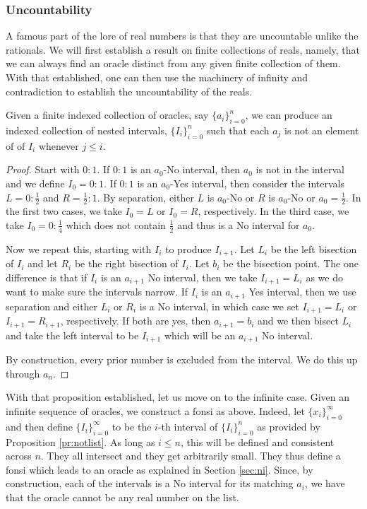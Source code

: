 \documentclass[12pt]{article}
\begin{document}
\subsubsection{Uncountability}

A famous part of the lore of real numbers is that they are uncountable unlike the rationals. We will first establish a result on finite collections of reals, namely, that we can always find an oracle distinct from any given finite collection of them. With that established, one can then use the machinery of infinity and contradiction to establish the uncountability of the reals. 

\begin{proposition}\label{pr:notlist}
Given a finite indexed collection of oracles, say $\{a_i\}_{i=0}^n$, we can produce an indexed collection of nested intervals, $\{I_i\}_{i=0}^n$ such that each $a_j$ is not an element of of $I_i$ whenever $j \leq i$.
\end{proposition}

\begin{proof}
Start with $0:1$. If $0:1$ is an $a_0$-No interval, then $a_0$ is not in the interval and we define $I_0 = 0:1$. If $0:1$ is an $a_0$-Yes interval, then consider the intervals $L= 0:\tfrac{1}{2}$ and $R = \tfrac{1}{2}:1$. By separation, either $L$ is $a_0$-No or $R$ is $a_0$-No or $a_0 = \tfrac{1}{2}$. In the first two cases, we take $I_0=L$ or $I_0=R$, respectively. In the third case, we take $I_0 = 0:\tfrac{1}{4}$ which does not contain $\tfrac{1}{2}$ and thus is a No interval for $a_0$.

Now we repeat this, starting with $I_i$ to produce $I_{i+1}$. Let $L_i$ be the left bisection of $I_i$ and let $R_i$ be the right bisection of $I_i$. Let $b_i$ be the bisection point. The one difference is that if $I_i$ is an $a_{i+1}$ No interval, then we take $I_{i+1} = L_i$ as we do want to make sure the intervals narrow. If $I_i$ is an $a_{i+1}$ Yes interval, then we use separation and either $L_i$ or $R_i$ is a No interval, in which case we set $I_{i+1} = L_i $ or $I_{i+1} = R_{i+1}$, respectively. If both are yes, then $a_{i+1} = b_i$ and we then bisect $L_i$ and take the left interval to be $I_{i+1}$ which will be an $a_{i+1}$ No interval. 

By construction, every prior number is excluded from the interval. We do this up through $a_n$.
\end{proof} 

With that proposition established, let us move on to the infinite case. Given an infinite sequence of oracles, we construct a fonsi as above. Indeed, let $\{x_i\}_{i=0}^{\infty}$ and then define $\{I_i\}_{i=0}^{\infty}$ to be the $i$-th interval of $\{I_i\}_{i=0}^{n}$ as provided by Proposition \ref{pr:notlist}. As long as $i \leq n$, this will be defined and consistent across $n$. They all intersect and they get arbitrarily small. They thus define a fonsi which leads to an oracle as explained in Section \ref{sec:ni}. Since, by construction, each of the intervals is a No interval for its matching $a_i$, we have that the oracle cannot be any real number on the list. 
\end{document}
